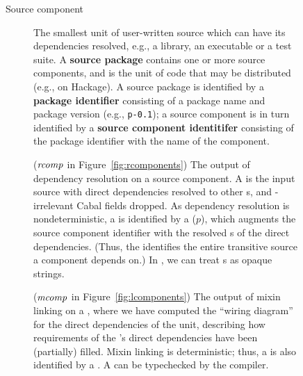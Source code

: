 \begin{figure}
\begin{mdframed}
\begin{description}
    \item[Source component]
        The smallest unit of user-written source which can have its
        dependencies resolved, e.g., a library, an executable or a test
        suite.  A \textbf{source package} contains one or more source
        components, and is the unit of code that may be distributed
        (e.g., on Hackage).  A source package is identified by a
        \textbf{package identifier} consisting of a package name and
        package version (e.g., \verb|p-0.1|); a source component is in
        turn identified by a \textbf{source component identitifer}
        consisting of the package identifier with the name of the
        component.
    \item[\Ccomp{}] ($\mathit{rcomp}$ in Figure~\ref{fig:rcomponents}) The output of dependency
        resolution on a source component.  A \ccomp{} is the
        input source with direct dependencies resolved to
        other \ccomp{}s, and \Backpack{}-irrelevant Cabal fields dropped.
        As dependency resolution is
        nondeterministic, a \ccomp{} is identified by a \textbf{\cid}
        ($p$), which augments the source component identifier with the
        resolved \cid{}s of the direct dependencies.  (Thus, the \cid{}
        identifies the entire transitive source a component depends on.)
        In \Backpack{}, we can treat \cid{}s as opaque strings.
    \item[\Unit{}] ($\mathit{mcomp}$ in Figure~\ref{fig:lcomponents}) The output
        of mixin linking on a \ccomp{}, where we have computed the ``wiring
        diagram'' for the direct dependencies of the unit, describing how
        requirements of the \ccomp{}'s direct dependencies have been
        (partially) filled.  Mixin linking is
        deterministic; thus, a \unit{} is also identified by a \cid{}.  A
        \unit{} can be typechecked by the compiler.

\end{description}
\end{mdframed}
\end{figure}
